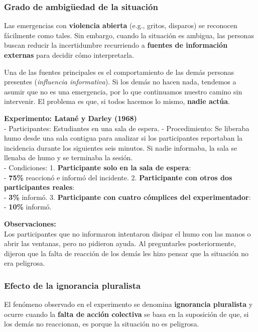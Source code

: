 \documentclass[
]{book}
\begin{document}
\subsubsection{Grado de ambigüedad de la situación}\label{grado-de-ambiguxfcedad-de-la-situaciuxf3n}

Las emergencias con \textbf{violencia abierta} (e.g., gritos, disparos) se reconocen fácilmente como tales. Sin embargo, cuando la situación es ambigua, las personas buscan reducir la incertidumbre recurriendo a \textbf{fuentes de información externas} para decidir cómo interpretarla.

Una de las fuentes principales es el comportamiento de las demás personas presentes (\emph{influencia informativa}). Si los demás no hacen nada, tendemos a asumir que no es una emergencia, por lo que continuamos nuestro camino sin intervenir. El problema es que, si todos hacemos lo mismo, \textbf{nadie actúa}.

\textbf{Experimento: Latané y Darley (1968)}\\
- Participantes: Estudiantes en una sala de espera.
- Procedimiento: Se liberaba humo desde una sala contigua para analizar si los participantes reportaban la incidencia durante los siguientes seis minutos. Si nadie informaba, la sala se llenaba de humo y se terminaba la sesión.\\
- Condiciones:
1. \textbf{Participante solo en la sala de espera}:\\
- \textbf{75\%} reaccionó e informó del incidente.
2. \textbf{Participante con otros dos participantes reales}:\\
- \textbf{3\%} informó.
3. \textbf{Participante con cuatro cómplices del experimentador}:\\
- \textbf{10\%} informó.

\textbf{Observaciones:}\\
Los participantes que no informaron intentaron disipar el humo con las manos o abrir las ventanas, pero no pidieron ayuda. Al preguntarles posteriormente, dijeron que la falta de reacción de los demás les hizo pensar que la situación no era peligrosa.

\subsubsection{Efecto de la ignorancia pluralista}\label{efecto-de-la-ignorancia-pluralista}

El fenómeno observado en el experimento se denomina \textbf{ignorancia pluralista} y ocurre cuando la \textbf{falta de acción colectiva} se basa en la suposición de que, si los demás no reaccionan, es porque la situación no es peligrosa.
\end{document}
